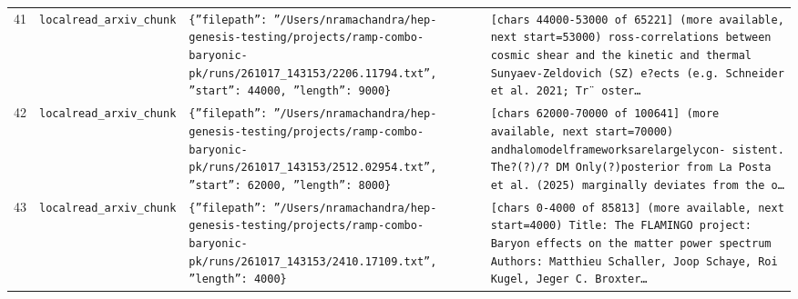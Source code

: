 \documentclass[11pt,a4paper]{article}
\begin{document}
\begin{longtable}{@{}p{}p{}p{}p{}@{}}
41 & \texttt{local}\newline\texttt{read\_\allowbreak{}arxiv\_\allowbreak{}chunk} & \texttt{\{''filepath'':\allowbreak{} ''/\allowbreak{}Users/\allowbreak{}nramachandra/\allowbreak{}hep-genesis-testing/\allowbreak{}projects/\allowbreak{}ramp-combo-baryonic-pk/\allowbreak{}runs/\allowbreak{}261017\_\allowbreak{}143153/\allowbreak{}2206.11794.txt'',\allowbreak{} ''start'':\allowbreak{} 44000,\allowbreak{} ''length'':\allowbreak{} 9000\}\allowbreak{}} & \texttt{[chars 44000-53000 of 65221]\allowbreak{} (more available,\allowbreak{} next start=\allowbreak{}53000)\allowbreak{}  ross-correlations between cosmic shear and the kinetic and thermal Sunyaev-Zeldovich (SZ)\allowbreak{} e?ects (e.g. Schneider et al. 2021;\allowbreak{} Tr¨ oster\ldots{}\allowbreak{}} \\
42 & \texttt{local}\newline\texttt{read\_\allowbreak{}arxiv\_\allowbreak{}chunk} & \texttt{\{''filepath'':\allowbreak{} ''/\allowbreak{}Users/\allowbreak{}nramachandra/\allowbreak{}hep-genesis-testing/\allowbreak{}projects/\allowbreak{}ramp-combo-baryonic-pk/\allowbreak{}runs/\allowbreak{}261017\_\allowbreak{}143153/\allowbreak{}2512.02954.txt'',\allowbreak{} ''start'':\allowbreak{} 62000,\allowbreak{} ''length'':\allowbreak{} 8000\}\allowbreak{}} & \texttt{[chars 62000-70000 of 100641]\allowbreak{} (more available,\allowbreak{} next start=\allowbreak{}70000)\allowbreak{}  andhalomodelframeworksarelargelycon- sistent. The?(?)\allowbreak{}/\allowbreak{}? DM Only(?)\allowbreak{}posterior from La Posta et al. (2025)\allowbreak{} marginally deviates from the o\ldots{}\allowbreak{}} \\
43 & \texttt{local}\newline\texttt{read\_\allowbreak{}arxiv\_\allowbreak{}chunk} & \texttt{\{''filepath'':\allowbreak{} ''/\allowbreak{}Users/\allowbreak{}nramachandra/\allowbreak{}hep-genesis-testing/\allowbreak{}projects/\allowbreak{}ramp-combo-baryonic-pk/\allowbreak{}runs/\allowbreak{}261017\_\allowbreak{}143153/\allowbreak{}2410.17109.txt'',\allowbreak{} ''length'':\allowbreak{} 4000\}\allowbreak{}} & \texttt{[chars 0-4000 of 85813]\allowbreak{} (more available,\allowbreak{} next start=\allowbreak{}4000)\allowbreak{}  Title:\allowbreak{} The FLAMINGO project:\allowbreak{} Baryon effects on the matter power spectrum Authors:\allowbreak{} Matthieu Schaller,\allowbreak{} Joop Schaye,\allowbreak{} Roi Kugel,\allowbreak{} Jeger C. Broxter\ldots{}\allowbreak{}} \\

\end{longtable}
\end{document}
